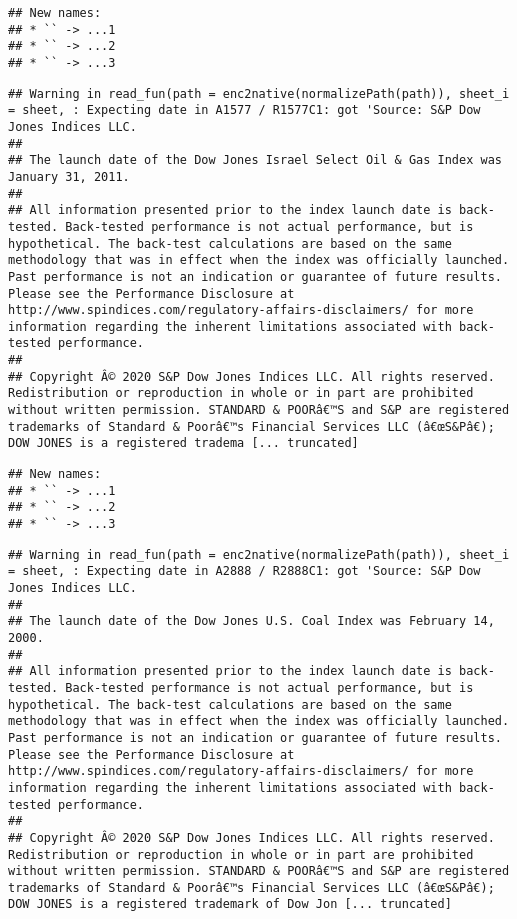 \documentclass[
]{article}
\begin{document}
\begin{verbatim}
## New names:
## * `` -> ...1
## * `` -> ...2
## * `` -> ...3
\end{verbatim}

\begin{verbatim}
## Warning in read_fun(path = enc2native(normalizePath(path)), sheet_i = sheet, : Expecting date in A1577 / R1577C1: got 'Source: S&P Dow Jones Indices LLC.
## 
## The launch date of the Dow Jones Israel Select Oil & Gas Index was January 31, 2011.
## 
## All information presented prior to the index launch date is back-tested. Back-tested performance is not actual performance, but is hypothetical. The back-test calculations are based on the same methodology that was in effect when the index was officially launched. Past performance is not an indication or guarantee of future results.  Please see the Performance Disclosure at http://www.spindices.com/regulatory-affairs-disclaimers/ for more information regarding the inherent limitations associated with back-tested performance.
## 
## Copyright Â© 2020 S&P Dow Jones Indices LLC. All rights reserved. Redistribution or reproduction in whole or in part are prohibited without written permission. STANDARD & POORâ€™S and S&P are registered trademarks of Standard & Poorâ€™s Financial Services LLC (â€œS&Pâ€); DOW JONES is a registered tradema [... truncated]
\end{verbatim}

\begin{verbatim}
## New names:
## * `` -> ...1
## * `` -> ...2
## * `` -> ...3
\end{verbatim}

\begin{verbatim}
## Warning in read_fun(path = enc2native(normalizePath(path)), sheet_i = sheet, : Expecting date in A2888 / R2888C1: got 'Source: S&P Dow Jones Indices LLC.
## 
## The launch date of the Dow Jones U.S. Coal Index was February 14, 2000.
## 
## All information presented prior to the index launch date is back-tested. Back-tested performance is not actual performance, but is hypothetical. The back-test calculations are based on the same methodology that was in effect when the index was officially launched. Past performance is not an indication or guarantee of future results.  Please see the Performance Disclosure at http://www.spindices.com/regulatory-affairs-disclaimers/ for more information regarding the inherent limitations associated with back-tested performance.
## 
## Copyright Â© 2020 S&P Dow Jones Indices LLC. All rights reserved. Redistribution or reproduction in whole or in part are prohibited without written permission. STANDARD & POORâ€™S and S&P are registered trademarks of Standard & Poorâ€™s Financial Services LLC (â€œS&Pâ€); DOW JONES is a registered trademark of Dow Jon [... truncated]
\end{verbatim}
\end{document}
